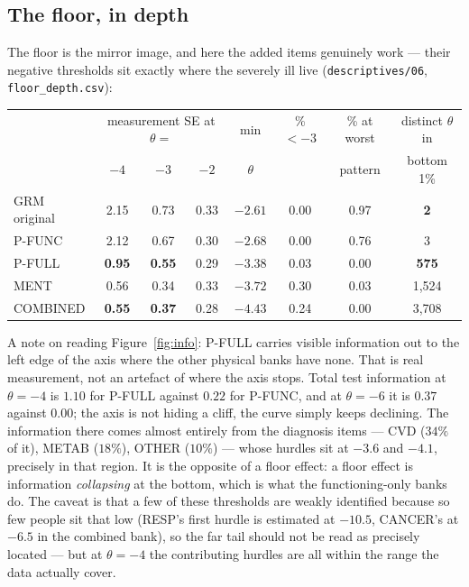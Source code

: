 \documentclass[11pt]{article}
\newcommand{\code}[1]{\texttt{\small #1}}
\begin{document}
\subsection*{The floor, in depth}

The floor is the mirror image, and here the added items genuinely work ---
their negative thresholds sit exactly where the severely ill live
(\code{descriptives/06}, \code{floor\_depth.csv}):

\begin{center}\small
\begin{tabular}{lccccccc}
\toprule
 & \multicolumn{3}{c}{measurement SE at $\theta=$} & min & \% $<-3$ &
\% at worst & distinct $\theta$ in \\
 & $-4$ & $-3$ & $-2$ & $\theta$ & & pattern & bottom 1\% \\
\midrule
GRM original & 2.15 & 0.73 & 0.33 & $-2.61$ & 0.00 & 0.97 & \textbf{2} \\
P-FUNC & 2.12 & 0.67 & 0.30 & $-2.68$ & 0.00 & 0.76 & 3 \\
P-FULL & \textbf{0.95} & \textbf{0.55} & 0.29 & $-3.38$ & 0.03 & 0.00 & \textbf{575} \\
MENT & 0.56 & 0.34 & 0.33 & $-3.72$ & 0.30 & 0.03 & 1{,}524 \\
COMBINED & \textbf{0.55} & \textbf{0.37} & 0.28 & $-4.43$ & 0.24 & 0.00 & 3{,}708 \\
\bottomrule
\end{tabular}
\end{center}

A note on reading Figure~\ref{fig:info}: P-FULL carries visible information
out to the left edge of the axis where the other physical banks have none.
That is real measurement, not an artefact of where the axis stops. Total test
information at $\theta = -4$ is $1.10$ for P-FULL against $0.22$ for P-FUNC,
and at $\theta = -6$ it is $0.37$ against $0.00$; the axis is not hiding a
cliff, the curve simply keeps declining. The information there comes almost
entirely from the diagnosis items --- CVD ($34\%$ of it), METAB ($18\%$),
OTHER ($10\%$) --- whose hurdles sit at $-3.6$ and $-4.1$, precisely in that
region. It is the opposite of a floor effect: a floor effect is information
\emph{collapsing} at the bottom, which is what the functioning-only banks do.
The caveat is that a few of these thresholds are weakly identified because so
few people sit that low (RESP's first hurdle is estimated at $-10.5$, CANCER's
at $-6.5$ in the combined bank), so the far tail should not be read as
precisely located --- but at $\theta = -4$ the contributing hurdles are all
within the range the data actually cover.
\end{document}
